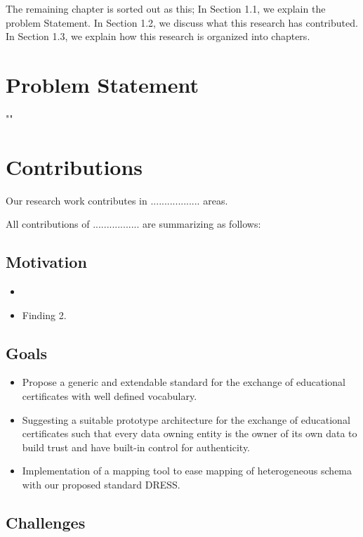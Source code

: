 \documentclass[12pt,a4paper,oneside]{book}
\begin{document}
The remaining chapter is sorted out as this; In Section 1.1, we explain the problem Statement. In Section 1.2, we discuss what this research has contributed. In Section 1.3, we explain how this research is organized into chapters.

\section{Problem Statement}\label{s-problem_statement}

""

\section{Contributions}\label{s-contributions}

Our research work contributes in .................. areas.

All contributions of ................. are summarizing as follows:

\subsection{Motivation}

\begin{itemize}
\item

\item
Finding 2.
\end{itemize}

\subsection{Goals}

\begin{itemize}
\item
Propose a generic and extendable standard for the exchange of educational certificates with well defined vocabulary.
\item
Suggesting a suitable prototype architecture for the exchange of educational certificates such that 
every data owning entity is the owner of its own data to build trust and have built-in control for authenticity.
\item
Implementation of a mapping tool to ease mapping of heterogeneous schema with our proposed standard DRESS.
\end{itemize}

\subsection{Challenges}
\end{document}
